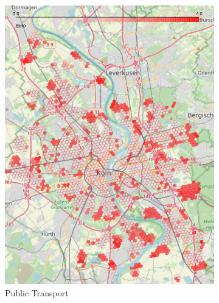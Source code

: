 \begin{figure}
     \centering
     \begin{subfigure}[b]{0.3\textwidth}
         \centering
         \includegraphics[width=\textwidth]{Figures/results/cost/public_transport_cost_map}
         \caption{Public Transport}
         \label{fig:public_transport_cost_map}
     \end{subfigure}
     \hfill
     \begin{subfigure}[b]{0.3\textwidth}
         \centering

\end{subfigure}
\end{figure}
